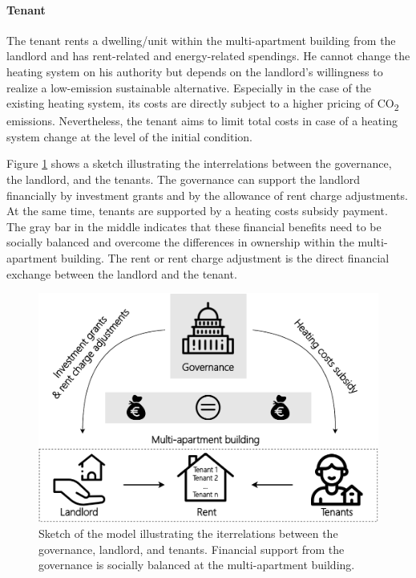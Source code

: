 \paragraph{Tenant} The tenant rents a dwelling/unit within the multi-apartment building from the landlord and has rent-related and energy-related spendings. He cannot change the heating system on his authority but depends on the landlord's willingness to realize a low-emission sustainable alternative. Especially in the case of the existing heating system, its costs are directly subject to a higher pricing of CO\textsubscript{2} emissions. Nevertheless, the tenant aims to limit total costs in case of a heating system change at the level of the initial condition.\vspace{0.5cm}

Figure \ref{fig:methodology} shows a sketch illustrating the interrelations between the governance, the landlord, and the tenants. The governance can support the landlord financially by investment grants and by the allowance of rent charge adjustments. At the same time, tenants are supported by a heating costs subsidy payment. The gray bar in the middle indicates that these financial benefits need to be socially balanced and overcome the differences in ownership within the multi-apartment building. The rent or rent charge adjustment is the direct financial exchange between the landlord and the tenant.\vspace{0.5cm}

\begin{figure}[h]
	\centering
	\includegraphics[width=0.7\linewidth]{figures/3_Methodology/Sketch.pdf}
	\caption{Sketch of the model illustrating the iterrelations between the governance, landlord, and tenants. Financial support from the governance is socially balanced at the multi-apartment building.}
	\label{fig:methodology}
\end{figure}


